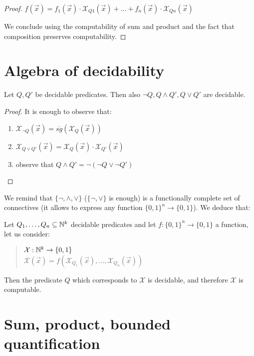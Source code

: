 \begin{proof}
$f(\vec{x}) = f_1(\vec{x}) \cdot \mathcal{X}_{Q1}(\vec{x}) + \dots + f_n(\vec{x}) \cdot \mathcal{X}_{Qn}(\vec{x})$

We conclude using the computability of sum and product and the fact that composition preserves computability.
\end{proof}

\section{Algebra of decidability}

\begin{lemma}
  Let $Q, Q'$ be  decidable predicates.  Then also $\neg Q, Q \wedge Q', Q \vee Q'$ are decidable.
\end{lemma}

\begin{proof}
It is enough to observe that:
\begin{enumerate}
\item $\mathcal{X}_{\lnot Q}(\vec{x}) =  \overline{sg}(\mathcal{X}_Q(\vec{x}))$
\item $\mathcal{X}_{Q \vee Q'}(\vec{x}) = \mathcal{X}_{Q}(\vec{x}) \cdot \mathcal{X}_{Q'}(\vec{x})$
\item observe that $Q \wedge Q' = \lnot (\lnot Q \vee \lnot Q')$
\end{enumerate}
\end{proof}

We remind that $\{\neg, \wedge, \vee \}$ ($\{\neg, \vee \}$ is enough) is a functionally complete set of connectives (it allows to express any function $\{0,1\}^n \rightarrow \{0,1\}$). We deduce that:
\begin{corollary}
  Let $Q_1, \dots, Q_n \subseteq \mathbb{N}^k$ decidable predicates and let $f:\{0,1\}^n \rightarrow \{0,1\}$ a function, let us consider:
  \begin{quote}
    $\mathcal{X}: \mathbb{N}^k\rightarrow\{0,1\}$\\
    $\mathcal{X}(\vec{x}) = f(\mathcal{X}_{Q_1}(\vec{x}), \dots, \mathcal{X}_{Q_n}(\vec{x}) )$
  \end{quote}
  Then the predicate $Q$ which corresponds to $\mathcal{X}$ is
  decidable, and therefore $\mathcal{X}$ is computable.
\end{corollary}

\section{Sum, product, bounded quantification}

